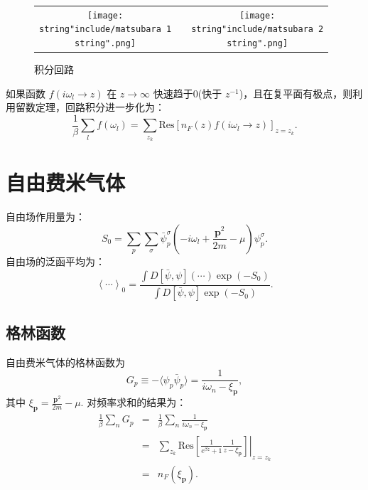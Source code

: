 \documentclass[10pt,UTF8]{ctexart}
\providecommand{\tabularnewline}{\\}
\begin{document}
\begin{figure}[H]
\begin{centering}
\begin{tabular}{ccc}
\texttt{[image: \\string"include/matsubara 1\\string".png]} &  & \texttt{[image: \\string"include/matsubara 2\\string".png]}\tabularnewline
\end{tabular}
\par\end{centering}
\caption{积分回路}
\end{figure}
\noindent
如果函数 $f\left(i\omega_{l}\rightarrow z\right)$ 在 $z\rightarrow \infty$ 快速趋于0(快于 $z^{-1}$)，且在复平面有极点，则利用留数定理，回路积分进一步化为：
\begin{equation}
	\frac{1}{\beta} \sum_{l}f\left(\omega_{l}\right)
	=\sum_{z_{k}} \mathrm{Res}\left[n_{F}(z) f\left(i\omega_{l}\rightarrow z\right)\right]_{z=z_k}.
\end{equation}



\section*{自由费米气体}
\noindent
自由场作用量为：
\begin{equation}
	S_{0}=\sum_{p}\sum_{\sigma}\bar{\psi}_{p}^{\sigma}\left(-i\omega_{l}+\frac{\bm{p}^{2}}{2m}-\mu\right)\psi_{p}^{\sigma}.
\end{equation}
自由场的泛函平均为：
\begin{equation}
	\left\langle \cdots\right\rangle _{0}=\frac{\int D\left[\bar{\psi},\psi\right]\left(\cdots\right)\exp\left(-S_{0}\right)}{\int D\left[\bar{\psi},\psi\right]\exp\left(-S_{0}\right)}.
\end{equation}


\subsection*{格林函数}
\noindent
自由费米气体的格林函数为
\begin{equation}
	G_{p} \equiv -\langle \psi_{p} \bar\psi_{p} \rangle 
	= \frac{1}{i\omega_n - \xi_{\bm p}},
\end{equation}
其中 $\xi_{\bm p}=\frac{\bm p^2}{2m}-\mu$. 对频率求和的结果为：
\begin{eqnarray}
	\frac{1}{\beta} \sum_{n} G_p & = & \frac{1}{\beta} \sum_{n}\frac{1}{i\omega_n - \xi_{\bm p}}\\
 	& = & \sum_{z_{k}} \left. \mathrm{Res}\left[\frac{1}{e^{\beta z}+1} \frac{1}{z-\xi_{\bm p}}\right]\right|_{z=z_{k}}\\
  	& = & n_{F}(\xi_{\bm p}).
\end{eqnarray}
\end{document}

